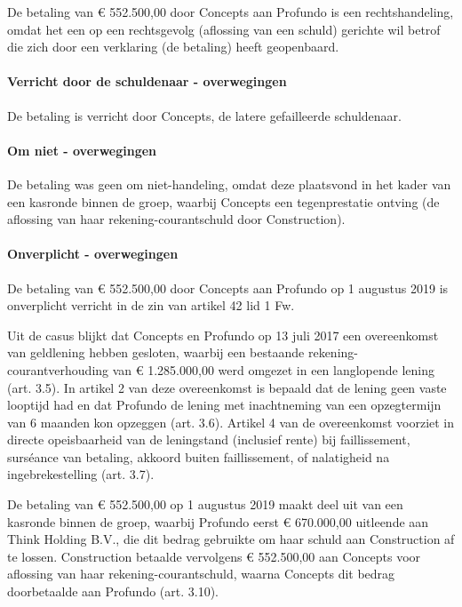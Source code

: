 \documentclass[
  dutch,
  a4paper,
]{article}
\begin{document}
De betaling van € 552.500,00 door Concepts aan Profundo is een rechtshandeling, omdat het een op een rechtsgevolg (aflossing van een schuld) gerichte wil betrof die zich door een verklaring (de betaling) heeft geopenbaard.

\paragraph{Verricht door de schuldenaar - overwegingen}\label{verricht-door-de-schuldenaar---overwegingen-39}

De betaling is verricht door Concepts, de latere gefailleerde schuldenaar.

\paragraph{Om niet - overwegingen}\label{om-niet---overwegingen-39}

De betaling was geen om niet-handeling, omdat deze plaatsvond in het kader van een kasronde binnen de groep, waarbij Concepts een tegenprestatie ontving (de aflossing van haar rekening-courantschuld door Construction).

\paragraph{Onverplicht - overwegingen}\label{onverplicht---overwegingen-39}

De betaling van € 552.500,00 door Concepts aan Profundo op 1 augustus 2019 is onverplicht verricht in de zin van artikel 42 lid 1 Fw.

Uit de casus blijkt dat Concepts en Profundo op 13 juli 2017 een overeenkomst van geldlening hebben gesloten, waarbij een bestaande rekening-courantverhouding van € 1.285.000,00 werd omgezet in een langlopende lening (art. 3.5). In artikel 2 van deze overeenkomst is bepaald dat de lening geen vaste looptijd had en dat Profundo de lening met inachtneming van een opzegtermijn van 6 maanden kon opzeggen (art. 3.6). Artikel 4 van de overeenkomst voorziet in directe opeisbaarheid van de leningstand (inclusief rente) bij faillissement, surséance van betaling, akkoord buiten faillissement, of nalatigheid na ingebrekestelling (art. 3.7).

De betaling van € 552.500,00 op 1 augustus 2019 maakt deel uit van een kasronde binnen de groep, waarbij Profundo eerst € 670.000,00 uitleende aan Think Holding B.V., die dit bedrag gebruikte om haar schuld aan Construction af te lossen. Construction betaalde vervolgens € 552.500,00 aan Concepts voor aflossing van haar rekening-courantschuld, waarna Concepts dit bedrag doorbetaalde aan Profundo (art. 3.10).
\end{document}

